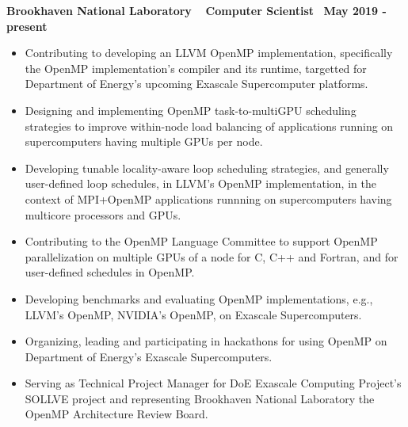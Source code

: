 \textbf{{Brookhaven National Laboratory $\>$$\>$$\>$$\>$Computer Scientist$\>$$\>$$\>$$\>$May 2019 - present}}
\begin{itemize}
   \item Contributing to developing an LLVM OpenMP implementation, specifically the OpenMP implementation's compiler and its runtime, targetted for Department of Energy's upcoming Exascale Supercomputer platforms.
   \item Designing and implementing OpenMP task-to-multiGPU scheduling strategies to improve within-node load balancing of applications running on supercomputers having multiple GPUs per node.
      \item Developing tunable locality-aware loop scheduling strategies, and generally user-defined loop schedules, in LLVM's OpenMP implementation, in the context of MPI+OpenMP applications runnning on supercomputers having multicore processors and GPUs.
   \item Contributing to the OpenMP Language Committee to support OpenMP parallelization on multiple GPUs of a node for C, C++ and Fortran, and for user-defined schedules in OpenMP.
   \item Developing benchmarks and evaluating OpenMP implementations, e.g., LLVM's OpenMP, NVIDIA's OpenMP, on Exascale Supercomputers.
   \item Organizing, leading and participating in hackathons for using OpenMP on Department of Energy's Exascale Supercomputers.
   \item Serving as Technical Project Manager for DoE Exascale Computing Project’s SOLLVE project and representing Brookhaven National Laboratory the OpenMP Architecture Review Board.
\end{itemize}

